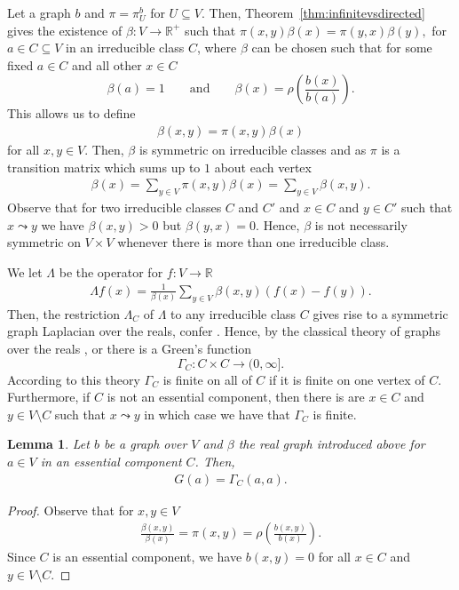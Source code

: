 \documentclass[a4paper,oneside, 12pt]{amsart}
\numberwithin{theorem}{section}
\newtheorem{lemma}[theorem]{Lemma}
\theoremstyle{definition}
\newcommand{\G}{{G}}
\newcommand{\prob}{\pi}
\newcommand{\rw}{\beta}
\newcommand{\subsV}{U}
\begin{document}
{Let a graph $ b $ and $ \pi=\pi_{\subsV}^{b} $ for $ \subsV      \subseteq     V$. Then, Theorem~\ref{thm:infinitevsdirected}  gives the existence of $ \beta: V\to \mathbb{R}^{+} $ such that $
\prob(x,y)\rw(x)=\prob(y,x)\rw(y),
$
for $ a\in C\subseteq V $ in an irreducible class $C$, where  $ \beta $ can be chosen such that for some fixed $ a\in C $ and all other $ x\in C $ $$  \beta (a)=1 \qquad\mbox{and}\qquad  \beta(x)=\rho \left(\frac{b(x)}{b(a)}\right) . $$  This allows us to define 
\begin{align*}
	\beta(x,y)=\prob(x,y)\rw(x) 
\end{align*}
for all $ x,y\in V $. Then, $ \beta $
 is symmetric on irreducible classes and as $ \pi $ is a transition matrix which sums up to $ 1 $ about each vertex
 \begin{align*}
 	\beta(x)=\sum_{y\in V}\pi(x,y)\beta(x) =\sum_{y\in V}\beta(x,y).
 \end{align*}
Observe that for two irreducible classes $ C $ and $ C' $ and $ x\in C $ and $ y\in C' $ such that $ x\leadsto y $ we have $ \beta(x,y)>0 $ but $ \beta(y,x) =0$. Hence, $ \beta $ is not necessarily symmetric on $ V\times V $ whenever there is more than one irreducible class.



We let $ \Lambda $ be the operator for $ f:V\to \mathbb{R} $
\begin{align*}
	\Lambda f(x) =\frac{1}{\beta(x)}	\sum_{y\in V}\beta(x,y)(f(x)-f(y)).
\end{align*}
Then, the restriction $ \Lambda_{C} $  of $ \Lambda $ to any irreducible class $ C $ gives rise to a symmetric graph Laplacian over the reals, confer \cite{KLW_book}. Hence, by the classical theory of graphs over the reals \cite{Woess00}, \cite{Woess09} or  \cite[Section~6]{KLW_book} there is a Green's function $$  \Gamma_{C} :C\times C\to  (0,\infty] . $$
According to this theory $ \Gamma_{C} $ is finite on all of $ C $ if it is finite on one vertex of $ C $. Furthermore, if $ C $ is not an essential component, then there is are $ x\in C $ and $ y\in V\setminus C $ such that $ x\leadsto y $ in which case we have that $ \Gamma_{C} $ is finite.



\begin{lemma}\label{lem::oneclassgraph}
	Let $b$ be a  graph over $V$ and $ \beta $ the real graph introduced above for $ a\in V $ in an essential component $ C $. Then, 
	\begin{align*}
		\G(a)=\Gamma_{C}(a,a).
	\end{align*}
\end{lemma}
\begin{proof}
Observe that for $ x,y\in V $
\begin{align*}
	\frac{\beta(x,y)}{\beta(x)} =\pi(x,y)=\rho\left(\frac{b(x,y)}{b(x)}\right).
\end{align*}
Since $ C $ is an essential component, we have $ b(x,y)=0 $ for all $ x\in C $ and $ y\in V\setminus C $.


\end{proof}}
\end{document}

